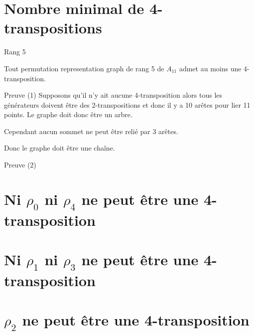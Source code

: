 \documentclass[10pt]{beamer}
\begin{document}
\section{Nombre minimal de 4-transpositions}

\begin{frame}{Rang 5}
  \begin{theorem}
    Tout permutation representation graph de rang 5 de $A_{11}$ admet au moins une 4-transposition.
  \end{theorem}
\end{frame}

\begin{frame}{Preuve (1)}
    Supposons qu'il n'y ait aucune 4-transposition alors tous les générateurs doivent être des 2-transpositions et donc il y a 10 arêtes pour lier 11 points. Le graphe doit donc être un arbre.

    Cependant aucun sommet ne peut être relié par 3 arêtes.

    \begin{figure}[H]
      \begin{center}
      \end{center}
    \end{figure}

    Donc le graphe doit être une chaîne.
\end{frame}

\begin{frame}{Preuve (2)}

\end{frame}

\section{Ni $\rho_0$ ni $\rho_4$ ne peut être une 4-transposition}

\section{Ni $\rho_1$ ni $\rho_3$ ne peut être une 4-transposition}

\section{$\rho_2$ ne peut être une 4-transposition}
\end{document}

